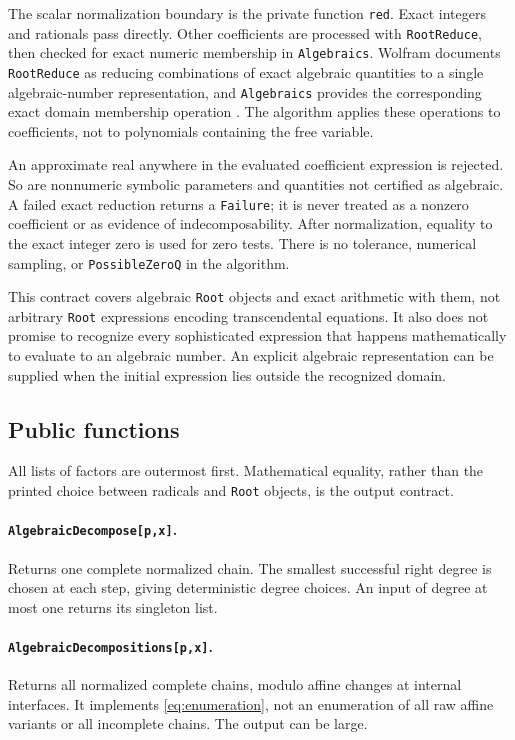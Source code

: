 \documentclass[11pt,a4paper]{article}
\numberwithin{equation}{section}
\theoremstyle{definition}
\theoremstyle{remark}
\newcommand{\code}[1]{\texttt{#1}}
\begin{document}
The scalar normalization boundary is the private function \code{red}. Exact
integers and rationals pass directly. Other coefficients are processed with
\code{RootReduce}, then checked for exact numeric membership in
\code{Algebraics}. Wolfram documents \code{RootReduce} as reducing combinations
of exact algebraic quantities to a single algebraic-number representation,
and \code{Algebraics} provides the corresponding exact domain membership
operation \cite{RootReduce,Algebraics}. The algorithm applies these operations
to coefficients, not to polynomials containing the free variable.

An approximate real anywhere in the evaluated coefficient expression is
rejected. So are nonnumeric symbolic parameters and quantities not certified
as algebraic. A failed exact reduction returns a \code{Failure}; it is never
treated as a nonzero coefficient or as evidence of indecomposability. After
normalization, equality to the exact integer zero is used for zero tests.
There is no tolerance, numerical sampling, or \code{PossibleZeroQ} in the
algorithm.

This contract covers algebraic \code{Root} objects and exact arithmetic with
them, not arbitrary \code{Root} expressions encoding transcendental equations.
It also does not promise to recognize every sophisticated expression that
happens mathematically to evaluate to an algebraic number. An explicit
algebraic representation can be supplied when the initial expression lies
outside the recognized domain.

\subsection{Public functions}
All lists of factors are outermost first. Mathematical equality, rather than
the printed choice between radicals and \code{Root} objects, is the output
contract.

\paragraph{\code{AlgebraicDecompose[p,x]}.}
Returns one complete normalized chain. The smallest successful right degree
is chosen at each step, giving deterministic degree choices. An input of
degree at most one returns its singleton list.

\paragraph{\code{AlgebraicDecompositions[p,x]}.}
Returns all normalized complete chains, modulo affine changes at internal
interfaces. It implements \eqref{eq:enumeration}, not an enumeration of all
raw affine variants or all incomplete chains. The output can be large.
\end{document}

